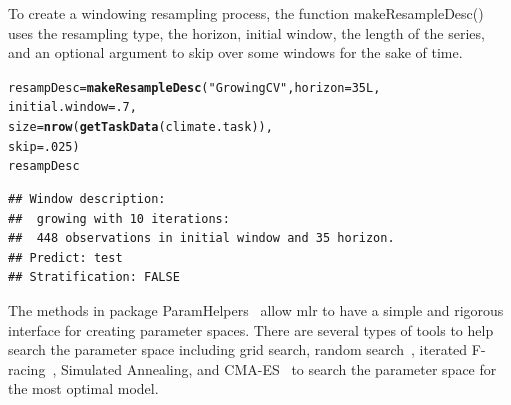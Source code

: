 \documentclass[12pt]{article}\usepackage[]{graphicx}\usepackage[]{color}
\makeatletter
\newcommand{\hlnum}[1]{\textcolor[rgb]{0.686,0.059,0.569}{#1}}%
\newcommand{\hlstr}[1]{\textcolor[rgb]{0.192,0.494,0.8}{#1}}%
\newcommand{\hlstd}[1]{\textcolor[rgb]{0.345,0.345,0.345}{#1}}%
\newcommand{\hlkwb}[1]{\textcolor[rgb]{0.69,0.353,0.396}{#1}}%
\newcommand{\hlkwc}[1]{\textcolor[rgb]{0.333,0.667,0.333}{#1}}%
\newcommand{\hlkwd}[1]{\textcolor[rgb]{0.737,0.353,0.396}{\textbf{#1}}}%
\newenvironment{kframe}{%
 \def\at@end@of@kframe{}%
 \ifinner\ifhmode%
  \def\at@end@of@kframe{\end{minipage}}%
  \begin{minipage}{\columnwidth}%
 \fi\fi%
 \def\FrameCommand##1{\hskip\@totalleftmargin \hskip-\fboxsep
 \colorbox{shadecolor}{##1}\hskip-\fboxsep
     \hskip-\linewidth \hskip-\@totalleftmargin \hskip\columnwidth}%
 \MakeFramed {\advance\hsize-\width
   \@totalleftmargin\z@ \linewidth\hsize
   \@setminipage}}%
 {\par\unskip\endMakeFramed%
 \at@end@of@kframe}
\newenvironment{knitrout}{}{} %
\theoremstyle{definition}
\newcommand\code{\@codex}
\def\@codex#1{{\normalfont\ttfamily\hyphenchar\font=-1 #1}}
\newcommand{\pkg}[1]{{\fontseries{b}\selectfont #1}}
\makeatother
\begin{document}
To create a windowing resampling process, the function \code{makeResampleDesc()} uses the resampling type, the horizon, initial window, the length of the series, and an optional argument to skip over some windows for the sake of time.

\singlespacing
\begin{knitrout}
\color{fgcolor}\begin{kframe}
\begin{alltt}
\hlstd{resampDesc} \hlkwb{=} \hlkwd{makeResampleDesc}\hlstd{(}\hlstr{"GrowingCV"}\hlstd{,} \hlkwc{horizon} \hlstd{=} \hlnum{35L}\hlstd{,}
                          \hlkwc{initial.window} \hlstd{=} \hlnum{.7}\hlstd{,}
                          \hlkwc{size} \hlstd{=} \hlkwd{nrow}\hlstd{(}\hlkwd{getTaskData}\hlstd{(climate.task)),}
                          \hlkwc{skip} \hlstd{=} \hlnum{.025}\hlstd{)}
\hlstd{resampDesc}
\end{alltt}
\begin{verbatim}
## Window description:
##  growing with 10 iterations:
##  448 observations in initial window and 35 horizon.
## Predict: test
## Stratification: FALSE
\end{verbatim}
\end{kframe}
\end{knitrout}
\doublespacing

The methods in package \pkg{ParamHelpers}~\cite{paramhelper} allow \pkg{mlr} to have a simple and rigorous interface for creating parameter spaces. There are several types of tools to help search the parameter space including grid search, random search~\cite{Bergstra}, iterated F-racing~\cite{irace}, Simulated Annealing, and CMA-ES~\cite{cmaes}  to search the parameter space for the most optimal model.
\end{document}
